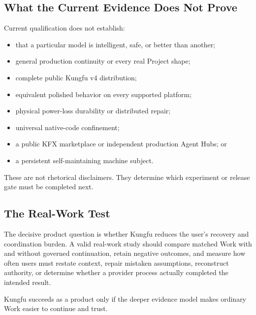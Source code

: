 \subsection{What the Current Evidence Does Not Prove}

Current qualification does not establish:

\begin{itemize}[leftmargin=*]
  \item that a particular model is intelligent, safe, or better than another;
  \item general production continuity or every real Project shape;
  \item complete public Kungfu v4 distribution;
  \item equivalent polished behavior on every supported platform;
  \item physical power-loss durability or distributed repair;
  \item universal native-code confinement;
  \item a public KFX marketplace or independent production Agent Hubs; or
  \item a persistent self-maintaining machine subject.
\end{itemize}

These are not rhetorical disclaimers. They determine which experiment or
release gate must be completed next.

\subsection{The Real-Work Test}

The decisive product question is whether Kungfu reduces the user's recovery
and coordination burden. A valid real-work study should compare matched Work
with and without governed continuation, retain negative outcomes, and measure
how often users must restate context, repair mistaken assumptions, reconstruct
authority, or determine whether a provider process actually completed the
intended result.

Kungfu succeeds as a product only if the deeper evidence model makes ordinary
Work easier to continue and trust.

